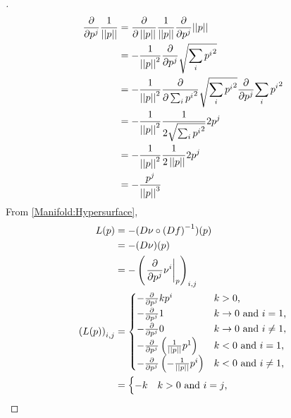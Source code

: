 \documentclass[stu, babel, american, biblatex, a4paper, leqno, draftall]{apa7}
\begin{document}
\begin{proof}[]
    \begin{align*}
        \frac{\partial}{\partial\tensor{p}{^j}}{\frac{1}{\norm{p}}}
        &= \frac{\partial}{\partial\norm{p}}{\frac{1}{\norm{p}}}\frac{\partial}{\partial\tensor{p}{^j}}{\norm{p}} \\
        &= {-\frac{1}{\norm{p}^2}}\frac{\partial}{\partial\tensor{p}{^j}}{\sqrt{\sum_i{{\tensor{p}{^i}}^2}}} \\
        &= {-\frac{1}{\norm{p}^2}}\frac{\partial}{\partial \sum_i{{\tensor{p}{^i}}^2}}{\sqrt{\sum_i{{\tensor{p}{^i}}^2}}}\frac{\partial}{\partial\tensor{p}{^j}}{\sum_i{{\tensor{p}{^i}}^2}} \\
        &= {-\frac{1}{\norm{p}^2}}\frac{1}{2\sqrt{\sum_i{{\tensor{p}{^i}}^2}}}{2{{\tensor{p}{^j}}}} \\
        &= {-\frac{1}{\norm{p}^2}}\frac{1}{2\norm{p}}{2{{\tensor{p}{^j}}}} \\
        &= -\frac{\tensor{p}{^j}}{\norm{p}^3}
    \end{align*}
    From \cref{Manifold:Hypersurface},
    \begin{align*}
        L(p)
        &= - (D\nu \circ \left(Df\right)^{-1})(p) \\
        &= - (D\nu)(p) \\
        &= - \left(\left.\frac{\partial}{\partial\tensor{p}{^j}}\tensor{\nu}{^i}\right|_p\right)_{i,j} \\
        \left(L(p)\right)_{i,j}
        &= \begin{cases}
            - \frac{\partial}{\partial\tensor{p}{^j}} k\tensor{p}{^i} & \text{$k>0$,} \\
            - \frac{\partial}{\partial\tensor{p}{^j}} 1 & \text{$k\to 0$ and $i=1$,} \\
            - \frac{\partial}{\partial\tensor{p}{^j}} 0 & \text{$k\to 0$ and $i\ne1$,} \\
            - \frac{\partial}{\partial\tensor{p}{^j}} \left({\frac{1}{\norm{p}}}\tensor{p}{^1}\right) & \text{$k<0$ and $i=1$,} \\
            - \frac{\partial}{\partial\tensor{p}{^j}} \left(-{\frac{1}{\norm{p}}}\tensor{p}{^i}\right) & \text{$k<0$ and $i\ne 1$,} \\
          \end{cases} \\
          &= \begin{cases}
              - k & \text{$k>0$ and $i=j$,} \\

\end{cases}
\end{align*}
\end{proof}
\end{document}
